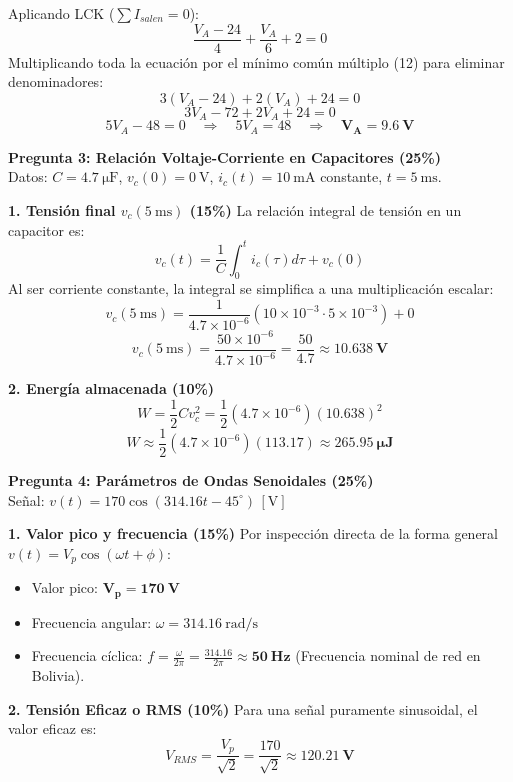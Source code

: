 \documentclass[11pt,a4paper]{article}
\begin{document}
Aplicando LCK ($\sum I_{salen} = 0$):
$$ \frac{V_A - 24}{4} + \frac{V_A}{6} + 2 = 0 $$
Multiplicando toda la ecuación por el mínimo común múltiplo (12) para eliminar denominadores:
$$ 3(V_A - 24) + 2(V_A) + 24 = 0 $$
$$ 3V_A - 72 + 2V_A + 24 = 0 $$
$$ 5V_A - 48 = 0 \quad \Rightarrow \quad 5V_A = 48 \quad \Rightarrow \quad \mathbf{V_A = \SI{9.6}{\volt}} $$

\vspace{0.5cm}
\noindent \textbf{Pregunta 3: Relación Voltaje-Corriente en Capacitores (25\%)} \\
Datos: $C = \SI{4.7}{\micro\farad}$, $v_c(0) = \SI{0}{\volt}$, $i_c(t) = \SI{10}{\milli\ampere}$ constante, $t = \SI{5}{\milli\second}$.

\textbf{1. Tensión final $v_c(\SI{5}{\milli\second})$ (15\%)}
La relación integral de tensión en un capacitor es:
$$ v_c(t) = \frac{1}{C} \int_{0}^{t} i_c(\tau) d\tau + v_c(0) $$
Al ser corriente constante, la integral se simplifica a una multiplicación escalar:
$$ v_c(\SI{5}{\milli\second}) = \frac{1}{4.7 \times 10^{-6}} \left( 10 \times 10^{-3} \cdot 5 \times 10^{-3} \right) + 0 $$
$$ v_c(\SI{5}{\milli\second}) = \frac{50 \times 10^{-6}}{4.7 \times 10^{-6}} = \frac{50}{4.7} \approx \mathbf{\SI{10.638}{\volt}} $$

\textbf{2. Energía almacenada (10\%)}
$$ W = \frac{1}{2} C v_c^2 = \frac{1}{2} (4.7 \times 10^{-6}) (10.638)^2 $$
$$ W \approx \frac{1}{2} (4.7 \times 10^{-6}) (113.17) \approx \mathbf{\SI{265.95}{\micro\joule}} $$

\vspace{0.5cm}
\noindent \textbf{Pregunta 4: Parámetros de Ondas Senoidales (25\%)} \\
Señal: $v(t) = 170 \cos(314.16 t - 45^\circ) \, [\unit{\volt}]$

\textbf{1. Valor pico y frecuencia (15\%)}
Por inspección directa de la forma general $v(t) = V_p \cos(\omega t + \phi)$:
\begin{itemize}
    \item Valor pico: $\mathbf{V_p = \SI{170}{\volt}}$
    \item Frecuencia angular: $\omega = \SI{314.16}{\radian\per\second}$
    \item Frecuencia cíclica: $f = \frac{\omega}{2\pi} = \frac{314.16}{2 \pi} \approx \mathbf{\SI{50}{\hertz}}$ (Frecuencia nominal de red en Bolivia).
\end{itemize}

\textbf{2. Tensión Eficaz o RMS (10\%)}
Para una señal puramente sinusoidal, el valor eficaz es:
$$ V_{RMS} = \frac{V_p}{\sqrt{2}} = \frac{170}{\sqrt{2}} \approx \mathbf{\SI{120.21}{\volt}} $$
\end{document}

